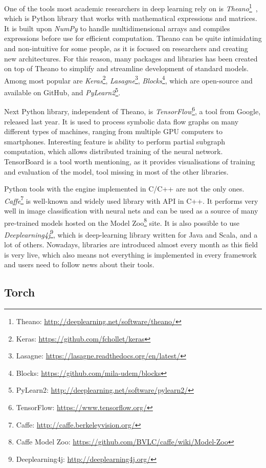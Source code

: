 One of the tools most academic researchers in deep learning rely on is \emph{Theano}\footnote{Theano: \url{http://deeplearning.net/software/theano/}}~\cite{bergstra-proc-scipy-2010}, which is Python library that works with mathematical expressions and matrices. It is built upon \emph{NumPy} to handle multidimensional arrays and compiles expressions before use for efficient computation. Theano can be quite intimidating and non-intuitive for some people, as it is focused on researchers and creating new architectures. For this reason, many packages and libraries has been created on top of Theano to simplify and streamline development of standard models. Among most popular are \emph{Keras}\footnote{Keras: \url{https://github.com/fchollet/keras}}, \emph{Lasagne}\footnote{Lasagne: \url{https://lasagne.readthedocs.org/en/latest/}}, \emph{Blocks}\footnote{Blocks: \url{https://github.com/mila-udem/blocks}}, which are open-source and available on GitHub, and \emph{PyLearn2}\footnote{PyLearn2: \url{http://deeplearning.net/software/pylearn2/}}.

Next Python library, independent of Theano, is \emph{TensorFlow}\footnote{TensorFlow: \url{https://www.tensorflow.org/}}, a tool from Google, released last year. It is used to process symbolic data flow graphs on many different types of machines, ranging from multiple GPU computers to smartphones. Interesting feature is ability to perform partial subgraph computation, which allows distributed training of the neural network. TensorBoard is a tool worth mentioning, as it provides visualisations of training and evaluation of the model, tool missing in most of the other libraries.

Python tools with the engine implemented in C/C++ are not the only ones. \emph{Caffe}\footnote{Caffe: \url{http://caffe.berkeleyvision.org/}} is well-known and widely used library with API in C++. It performs very well in image classification with neural nets and can be used as a source of many pre-trained models hosted on the Model Zoo\footnote{Caffe Model Zoo: \url{https://github.com/BVLC/caffe/wiki/Model-Zoo}} site. It is also possible to use \emph{Deeplearning4j}\footnote{Deeplearning4j: \url{http://deeplearning4j.org/}}, which is deep-learning library written for Java and Scala, and a lot of others. Nowadays, libraries are introduced almost every month as this field is very live, which also means not everything is implemented in every framework and users need to follow news about their tools.

\subsection{Torch}

